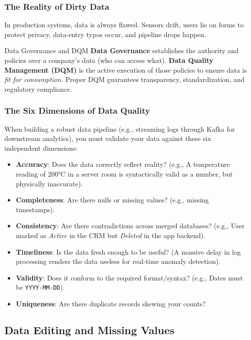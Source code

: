 \documentclass[11pt]{article}
\theoremstyle{smallexample}
\begin{document}
\subsubsection{The Reality of Dirty Data}
In production systems, data is always flawed. Sensors drift, users lie on forms to protect privacy, data-entry typos occur, and pipeline drops happen. 

\begin{defbox}{Data Governance and DQM}
    \textbf{Data Governance} establishes the authority and policies over a company's data (who can access what). 
    \textbf{Data Quality Management (DQM)} is the active execution of those policies to ensure data is \textit{fit for consumption.} Proper DQM guarantees transparency, standardization, and regulatory compliance.
\end{defbox}

\subsubsection{The Six Dimensions of Data Quality}

When building a robust data pipeline (e.g., streaming logs through Kafka for downstream analytics), you must validate your data against these six independent dimensions:

\begin{itemize}
    \item \textbf{Accuracy}: Does the data correctly reflect reality? (e.g., A temperature reading of 200°C in a server room is syntactically valid as a number, but physically inaccurate).
    \item \textbf{Completeness}: Are there nulls or missing values? (e.g., missing timestamps).
    \item \textbf{Consistency}: Are there contradictions across merged databases? (e.g., User marked as \textit{Active} in the CRM but \textit{Deleted} in the app backend).
    \item \textbf{Timeliness}: Is the data fresh enough to be useful? (A massive delay in log processing renders the data useless for real-time anomaly detection).
    \item \textbf{Validity}: Does it conform to the required format/syntax? (e.g., Dates must be \texttt{YYYY-MM-DD}).
    \item \textbf{Uniqueness}: Are there duplicate records skewing your counts?
\end{itemize}

\subsection{Data Editing and Missing Values}
\end{document}
